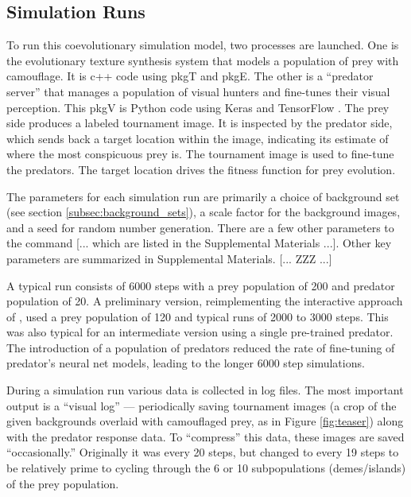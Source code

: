 \documentclass[acmtog]{acmart}
\newcommand{\texsyn}[0]{pkgT}
\newcommand{\lazypredator}[0]{pkgE}
\newcommand{\predatoreye}[0]{pkgV}
\begin{document}
\par


\subsection{Simulation Runs}
To run this coevolutionary simulation model, two processes are launched. One is the evolutionary texture synthesis system that models a population of prey with camouflage. It is c++ code using \texsyn{} and \lazypredator{}. The other is a “predator server” that manages a population of visual hunters and fine-tunes their visual perception. This \predatoreye{} is Python code using Keras \cite{chollet_keras_2015} and TensorFlow \cite{tensorflow_whitepaper_2015}. The prey side produces a labeled tournament image. It is inspected by the predator side, which sends back a target location within the image, indicating its estimate of where the most conspicuous prey is. The tournament image is used to fine-tune the predators. The target location drives the fitness function for prey evolution.
\par
The parameters for each simulation run are primarily a choice of background set (see section \ref{subsec:background_sets}), a scale factor for the background images, and a seed for random number generation. There are a few other parameters to the command [... which are listed in the Supplemental Materials ...]. Other key parameters are summarized in Supplemental Materials. [... ZZZ ...]
\par
A typical run consists of 6000 steps with a prey population of 200 and predator population of 20. A preliminary version, reimplementing the interactive approach of \citet{reynolds_iec_2011}, used a prey population of 120 and typical runs of 2000 to 3000 steps. This was also typical for an intermediate version using a single pre-trained predator. The introduction of a population of predators reduced the rate of fine-tuning of predator's neural net models, leading to the longer 6000 step simulations.
\par
During a simulation run various data is collected in log files. The most important output is a “visual log” — periodically saving tournament images (a crop of the given backgrounds overlaid with camouflaged prey, as in Figure \ref{fig:teaser}) along with the predator response data. To “compress” this data, these images are saved “occasionally.” Originally it was every 20 steps, but changed to every 19 steps to be relatively prime to cycling through the 6 or 10 subpopulations (demes/islands) of the prey population.
\par
\end{document}
